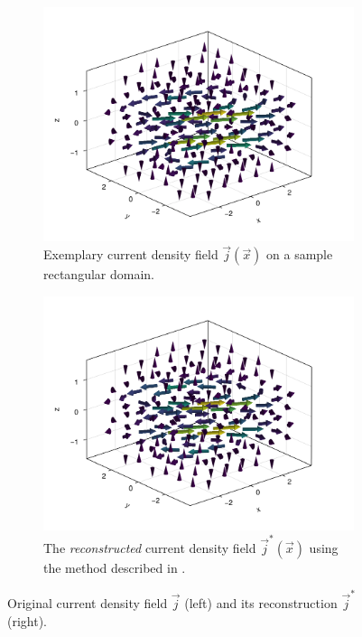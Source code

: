 \documentclass[10pt]{article}
\begin{document}
  \begin{figure}[H]
    \centering
    \begin{subfigure}[t]{0.48\textwidth}
      \centering
      \includegraphics[width=\textwidth]{../figures/cdpr-j-field.pdf}
      \caption{Exemplary current density field $\vec{j}(\vec{x})$ on a sample rectangular domain.}
      \label{fig:cdpr-j-field}
    \end{subfigure}
    \hfill
    \begin{subfigure}[t]{0.48\textwidth}
      \centering
      \includegraphics[width=\textwidth]{../figures/cdprr-j-field.pdf}
      \caption{The \textit{reconstructed} current density field $\vec{j}^*(\vec{x})$ using the method described in .}
      \label{fig:cdprr-j-field}
    \end{subfigure}
    \caption{Original current density field $\vec{j}$ (left) and its reconstruction $\vec{j}^*$ (right).}
    \label{fig:j-field}
  \end{figure}
\end{document}
